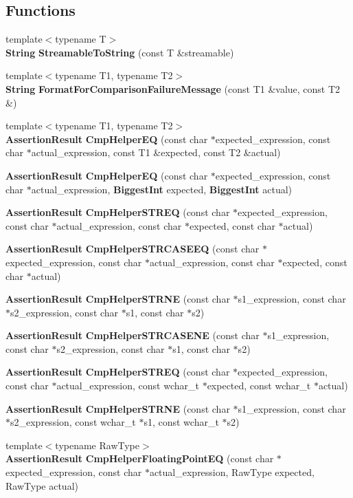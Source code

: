 \subsection*{Functions}
\begin{CompactItemize}
\item 
{\footnotesize template$<$typename T$>$ }\\{\bf String} {\bf StreamableToString} (const T \&streamable)
\item 
{\footnotesize template$<$typename T1, typename T2$>$ }\\{\bf String} {\bf FormatForComparisonFailureMessage} (const T1 \&value, const T2 \&)
\item 
{\footnotesize template$<$typename T1, typename T2$>$ }\\{\bf AssertionResult} {\bf CmpHelperEQ} (const char $\ast$expected\_\-expression, const char $\ast$actual\_\-expression, const T1 \&expected, const T2 \&actual)
\item 
{\bf AssertionResult} {\bf CmpHelperEQ} (const char $\ast$expected\_\-expression, const char $\ast$actual\_\-expression, {\bf BiggestInt} expected, {\bf BiggestInt} actual)
\item 
{\bf AssertionResult} {\bf CmpHelperSTREQ} (const char $\ast$expected\_\-expression, const char $\ast$actual\_\-expression, const char $\ast$expected, const char $\ast$actual)
\item 
{\bf AssertionResult} {\bf CmpHelperSTRCASEEQ} (const char $\ast$expected\_\-expression, const char $\ast$actual\_\-expression, const char $\ast$expected, const char $\ast$actual)
\item 
{\bf AssertionResult} {\bf CmpHelperSTRNE} (const char $\ast$s1\_\-expression, const char $\ast$s2\_\-expression, const char $\ast$s1, const char $\ast$s2)
\item 
{\bf AssertionResult} {\bf CmpHelperSTRCASENE} (const char $\ast$s1\_\-expression, const char $\ast$s2\_\-expression, const char $\ast$s1, const char $\ast$s2)
\item 
{\bf AssertionResult} {\bf CmpHelperSTREQ} (const char $\ast$expected\_\-expression, const char $\ast$actual\_\-expression, const wchar\_\-t $\ast$expected, const wchar\_\-t $\ast$actual)
\item 
{\bf AssertionResult} {\bf CmpHelperSTRNE} (const char $\ast$s1\_\-expression, const char $\ast$s2\_\-expression, const wchar\_\-t $\ast$s1, const wchar\_\-t $\ast$s2)
\item 
{\footnotesize template$<$typename RawType$>$ }\\{\bf AssertionResult} {\bf CmpHelperFloatingPointEQ} (const char $\ast$expected\_\-expression, const char $\ast$actual\_\-expression, RawType expected, RawType actual)

\end{CompactItemize}
